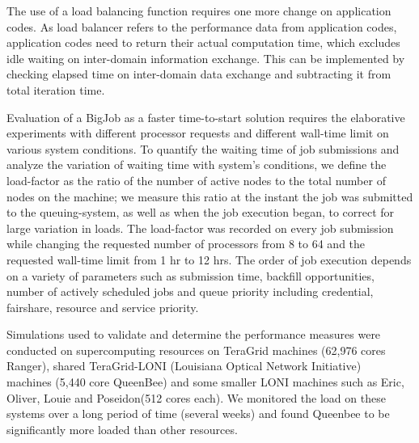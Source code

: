 \documentclass[conference,final]{IEEEtran}
\newcommand{\jhanote}[1]{ {\textcolor{red} { ***Jha: #1 }}}
\newcommand{\jhanote}[1]{}
\begin{document}
The use of a load balancing function requires one more change on
application codes. As load balancer refers to the performance data
from application codes, application codes need to return their actual
computation time, which excludes idle waiting on inter-domain
information exchange. This can be implemented by checking elapsed time
on inter-domain data exchange and subtracting it from total iteration
time.


Evaluation of a BigJob as a faster time-to-start solution requires the elaborative experiments with different processor requests and different wall-time limit on various system conditions. To quantify the waiting time of job submissions and analyze the variation of waiting time with system's conditions, we define the load-factor as the ratio of the number of active nodes to the total number of nodes on the machine; we measure this ratio at the instant the job was submitted to the queuing-system, as well as when the job execution began, to correct for large variation in loads. The load-factor was recorded on every job submission while changing the requested number of processors from 8 to 64 and the requested wall-time limit from 1 hr to 12 hrs. The order of job execution depends on a variety of parameters such as submission time, backfill opportunities, number of actively scheduled jobs and queue priority including credential, fairshare, resource and service priority. 



Simulations used to validate and determine the performance measures were
conducted on supercomputing resources on TeraGrid machines (62,976
cores Ranger), shared TeraGrid-LONI (Louisiana Optical Network
Initiative)~\cite{LONI_web} machines (5,440 core QueenBee)
and some smaller LONI machines such as Eric, Oliver, Louie and
Poseidon(512 cores each).  We monitored the load on these systems over a
long period of time (several weeks) and found Queenbee to be
significantly more loaded than other resources.

\end{document}
